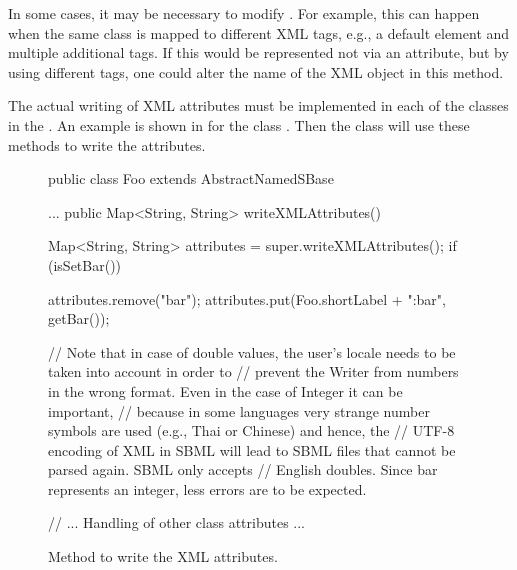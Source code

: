 In some cases, it may be necessary to modify .  For example, this can happen when the same class is mapped to
different XML tags, e.g., a default element and multiple additional tags.
If this would be represented not via an attribute, but by using different
tags, one could alter the name of the XML object in this method.

The actual writing of XML attributes must be implemented in each of the
classes in the .  An example is shown in 
 for the class .
Then the  class will use these methods to write
the attributes.

\begin{figure}[htb]
  \vspace*{-1ex}
  \begin{example}
public class Foo extends AbstractNamedSBase {
  ...
  public Map<String, String> writeXMLAttributes() {
    Map<String, String> attributes = super.writeXMLAttributes();
    if (isSetBar()) {
      attributes.remove("bar");
      attributes.put(Foo.shortLabel + ":bar", getBar());

      // Note that in case of double values, the user's locale needs to be taken into account in order to
      // prevent the Writer from numbers in the wrong format. Even in the case of Integer it can be important, 
      // because in some languages very strange number symbols are used (e.g., Thai or Chinese) and hence, the
      // UTF-8 encoding of XML in SBML will lead to SBML files that cannot be parsed again. SBML only accepts 
      // English doubles. Since bar represents an integer, less errors are to be expected.
    }

    // ... Handling of other class attributes ...
  }
}\end{example}
  \caption{Method to write the XML attributes.}
  \label{lst:ModelExtCreateXMLAttributes}
\end{figure}

